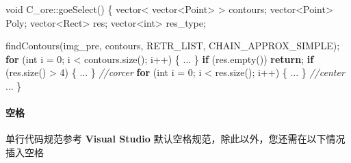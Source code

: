 \documentclass[
]{article}
\newenvironment{Shaded}{}{}
\newcommand{\CommentTok}[1]{\textcolor[rgb]{0.38,0.63,0.69}{\textit{#1}}}
\newcommand{\ControlFlowTok}[1]{\textcolor[rgb]{0.00,0.44,0.13}{\textbf{#1}}}
\newcommand{\DataTypeTok}[1]{\textcolor[rgb]{0.56,0.13,0.00}{#1}}
\newcommand{\DecValTok}[1]{\textcolor[rgb]{0.25,0.63,0.44}{#1}}
\newcommand{\NormalTok}[1]{#1}
\newcommand{\OperatorTok}[1]{\textcolor[rgb]{0.40,0.40,0.40}{#1}}
\begin{document}
\begin{Shaded}
\begin{Highlighting}[]
\DataTypeTok{void}\NormalTok{ C\_ore}\OperatorTok{::}\NormalTok{goeSelect}\OperatorTok{()} \OperatorTok{\{}
\NormalTok{	vector}\OperatorTok{\textless{}}\NormalTok{ vector}\OperatorTok{\textless{}}\NormalTok{Point}\OperatorTok{\textgreater{}} \OperatorTok{\textgreater{}}\NormalTok{	contours}\OperatorTok{;}
\NormalTok{	vector}\OperatorTok{\textless{}}\NormalTok{Point}\OperatorTok{\textgreater{}}\NormalTok{			Poly}\OperatorTok{;}
\NormalTok{	vector}\OperatorTok{\textless{}}\NormalTok{Rect}\OperatorTok{\textgreater{}}\NormalTok{			res}\OperatorTok{;}
\NormalTok{	vector}\OperatorTok{\textless{}}\DataTypeTok{int}\OperatorTok{\textgreater{}}				\DataTypeTok{res\_type}\OperatorTok{;}

\NormalTok{	findContours}\OperatorTok{(}\NormalTok{img\_pre}\OperatorTok{,}\NormalTok{ contours}\OperatorTok{,}\NormalTok{ RETR\_LIST}\OperatorTok{,}\NormalTok{ CHAIN\_APPROX\_SIMPLE}\OperatorTok{);}
	\ControlFlowTok{for} \OperatorTok{(}\DataTypeTok{int}\NormalTok{ i }\OperatorTok{=} \DecValTok{0}\OperatorTok{;}\NormalTok{ i }\OperatorTok{\textless{}}\NormalTok{ contours}\OperatorTok{.}\NormalTok{size}\OperatorTok{();}\NormalTok{ i}\OperatorTok{++)}
    	\OperatorTok{\{} \OperatorTok{...} \OperatorTok{\}}
	\ControlFlowTok{if} \OperatorTok{(}\NormalTok{res}\OperatorTok{.}\NormalTok{empty}\OperatorTok{())} \ControlFlowTok{return}\OperatorTok{;}
	\ControlFlowTok{if} \OperatorTok{(}\NormalTok{res}\OperatorTok{.}\NormalTok{size}\OperatorTok{()} \OperatorTok{\textgreater{}} \DecValTok{4}\OperatorTok{)}
    	\OperatorTok{\{} \OperatorTok{...} \OperatorTok{\}}
	\CommentTok{//corcer}
	\ControlFlowTok{for} \OperatorTok{(}\DataTypeTok{int}\NormalTok{ i }\OperatorTok{=} \DecValTok{0}\OperatorTok{;}\NormalTok{ i }\OperatorTok{\textless{}}\NormalTok{ res}\OperatorTok{.}\NormalTok{size}\OperatorTok{();}\NormalTok{ i}\OperatorTok{++)}
    	\OperatorTok{\{} \OperatorTok{...} \OperatorTok{\}}
	\CommentTok{//center}
	\OperatorTok{...}
\OperatorTok{\}}
\end{Highlighting}
\end{Shaded}

\hypertarget{ux7a7aux683c}{%
\paragraph{空格}\label{ux7a7aux683c}}

单行代码规范参考 \textbf{Visual Studio}
默认空格规范，除此以外，您还需在以下情况插入空格
\end{document}
